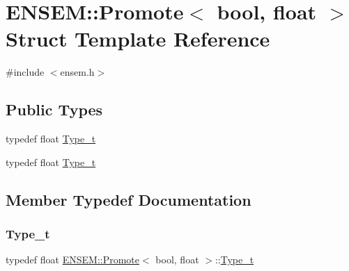 \hypertarget{structENSEM_1_1Promote_3_01bool_00_01float_01_4}{}\section{E\+N\+S\+EM\+:\+:Promote$<$ bool, float $>$ Struct Template Reference}
\label{structENSEM_1_1Promote_3_01bool_00_01float_01_4}


{\ttfamily \#include $<$ensem.\+h$>$}

\subsection*{Public Types}
\begin{DoxyCompactItemize}
\item 
typedef float \mbox{\hyperlink{structENSEM_1_1Promote_3_01bool_00_01float_01_4_aac75d1edfea4b854f38644f46a79ad71}{Type\+\_\+t}}
\item 
typedef float \mbox{\hyperlink{structENSEM_1_1Promote_3_01bool_00_01float_01_4_aac75d1edfea4b854f38644f46a79ad71}{Type\+\_\+t}}
\end{DoxyCompactItemize}


\subsection{Member Typedef Documentation}
\mbox{\label{structENSEM_1_1Promote_3_01bool_00_01float_01_4_aac75d1edfea4b854f38644f46a79ad71}} 
\subsubsection{\texorpdfstring{Type\_t}{Type\_t}\hspace{0.1cm}{\footnotesize\ttfamily [1/2]}}
{\footnotesize\ttfamily typedef float \mbox{\hyperlink{structENSEM_1_1Promote}{E\+N\+S\+E\+M\+::\+Promote}}$<$ bool, float $>$\+::\mbox{\hyperlink{structENSEM_1_1Promote_3_01bool_00_01float_01_4_aac75d1edfea4b854f38644f46a79ad71}{Type\+\_\+t}}}

\mbox{\label{structENSEM_1_1Promote_3_01bool_00_01float_01_4_aac75d1edfea4b854f38644f46a79ad71}} 
